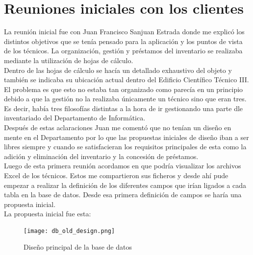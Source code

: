 \section{Reuniones iniciales con los clientes}

La reunión inicial fue con Juan Francisco Sanjuan Estrada donde me explicó los distintos objetivos que se tenía pensado para la aplicación y los puntos de vista de los técnicos. La organización, gestión y préstamos del inventario se realizaba mediante la utilización de hojas de cálculo.
\\Dentro de las hojas de cálculo se hacía un detallado exhaustivo del objeto y también se indicaba su ubicación actual dentro del Edificio Científico Técnico III.
\\El problema es que esto no estaba tan organizado como parecía en un principio debido a que la gestión no la realizaba únicamente un técnico sino que eran tres. Es decir, había tres filosofías distintas a la hora de ir gestionando una parte dle inventariado del Departamento de Informática.
\\Después de estas aclaraciones Juan me comentó que no tenían un diseño en mente en el Departamento por lo que las propuestas iniciales de diseño iban a ser libres siempre y cuando se satisfacieran los requisitos principales de esta como la adición y eliminación del inventario y la concesión de préstamos.
\vspace{\baselineskip}
\\Luego de esta primera reunión acordamos en que podría visualizar los archivos Excel de los técnicos. Estos me compartieron sus ficheros y desde ahí pude empezar a realizar la definición de los diferentes campos que irían ligados a cada tabla en la base de datos. Desde esa primera definición de campos se haría una propuesta inicial.
\\La propuesta inicial fue esta:

\begin{figure}
    \texttt{[image: db\_old\_design.png]}
    \caption{Diseño principal de la base de datos}
\end{figure}

